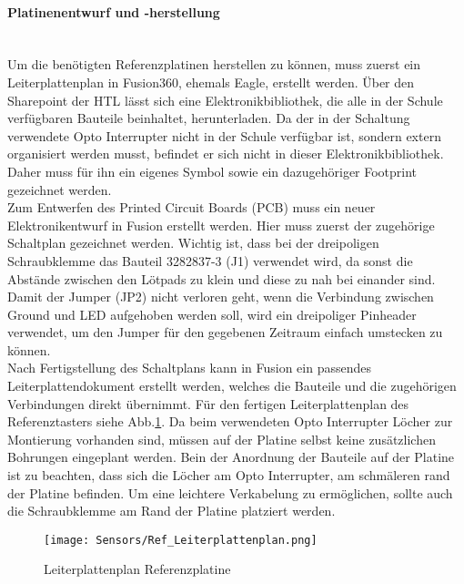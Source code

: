 \paragraph{Platinenentwurf und -herstellung} \mbox{}\\
Um die benötigten Referenzplatinen herstellen zu können, muss zuerst ein Leiterplattenplan in Fusion360, ehemals Eagle, erstellt werden. Über den Sharepoint der HTL lässt sich eine Elektronikbibliothek, die alle in der Schule verfügbaren Bauteile beinhaltet, herunterladen. Da der in der Schaltung verwendete Opto Interrupter nicht in der Schule verfügbar ist, sondern extern organisiert werden musst, befindet er sich nicht in dieser Elektronikbibliothek. Daher muss für ihn ein eigenes Symbol sowie ein dazugehöriger Footprint gezeichnet werden.\\
Zum Entwerfen des Printed Circuit Boards (PCB) muss ein neuer Elektronikentwurf in Fusion erstellt werden. Hier muss zuerst der zugehörige Schaltplan gezeichnet werden. Wichtig ist, dass bei der dreipoligen Schraubklemme das Bauteil 3282837-3 (J1) verwendet wird, da sonst die Abstände zwischen den Lötpads zu klein und diese zu nah bei einander sind. Damit der Jumper (JP2) nicht verloren geht, wenn die Verbindung zwischen Ground und LED aufgehoben werden soll, wird ein dreipoliger Pinheader verwendet, um den Jumper für den gegebenen Zeitraum einfach umstecken zu können.\\
Nach Fertigstellung des Schaltplans kann in Fusion ein passendes Leiterplattendokument erstellt werden, welches die Bauteile und die zugehörigen Verbindungen direkt übernimmt. Für den fertigen Leiterplattenplan des Referenztasters siehe Abb.\ref{Ref_LPPlan}. Da beim verwendeten Opto Interrupter Löcher zur Montierung vorhanden sind, müssen auf der Platine selbst keine zusätzlichen Bohrungen eingeplant werden. Bein der Anordnung der Bauteile auf der Platine ist zu beachten, dass sich die Löcher am Opto Interrupter, am schmäleren rand der Platine befinden. Um eine leichtere Verkabelung zu ermöglichen, sollte auch die Schraubklemme am Rand der Platine platziert werden.

\begin{figure}[H]
    \centering
    \texttt{[image: Sensors/Ref\_Leiterplattenplan.png]}
    \caption{Leiterplattenplan Referenzplatine}
    \label{Ref_LPPlan}
\end{figure}

